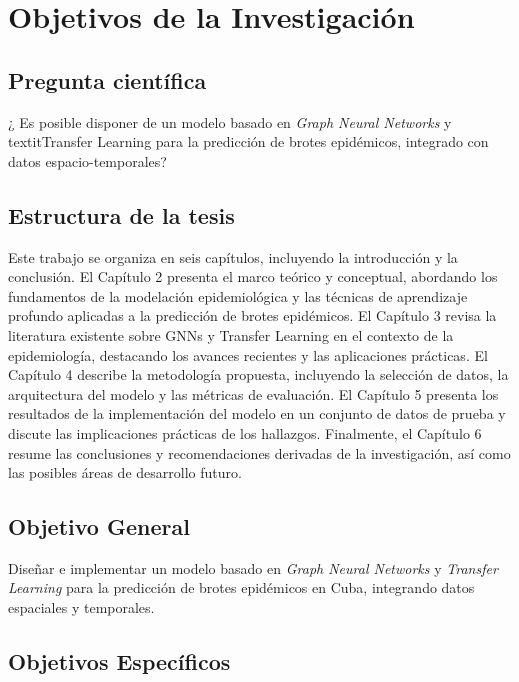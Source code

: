 \section*{Objetivos de la Investigación}

\subsection*{Pregunta científica}

¿ Es posible disponer de un modelo basado en \textit{Graph Neural Networks} y textit{Transfer Learning} para la predicción de brotes epidémicos, integrado con datos espacio-temporales?


\subsection*{Estructura de la tesis}

Este trabajo se organiza en seis capítulos, incluyendo la introducción y la conclusión. El Capítulo 2 presenta el marco teórico y conceptual, abordando los fundamentos de la modelación epidemiológica y las técnicas de aprendizaje profundo aplicadas a la predicción de brotes epidémicos. El Capítulo 3 revisa la literatura existente sobre GNNs y Transfer Learning en el contexto de la epidemiología, destacando los avances recientes y las aplicaciones prácticas. El Capítulo 4 describe la metodología propuesta, incluyendo la selección de datos, la arquitectura del modelo y las métricas de evaluación. El Capítulo 5 presenta los resultados de la implementación del modelo en un conjunto de datos de prueba y discute las implicaciones prácticas de los hallazgos. Finalmente, el Capítulo 6 resume las conclusiones y recomendaciones derivadas de la investigación, así como las posibles áreas de desarrollo futuro.


\subsection*{Objetivo General}

Diseñar e implementar un modelo basado en \textit{Graph Neural Networks} y \textit{Transfer Learning} para la predicción de brotes epidémicos en Cuba, integrando datos espaciales y temporales.


\subsection*{Objetivos Específicos}

